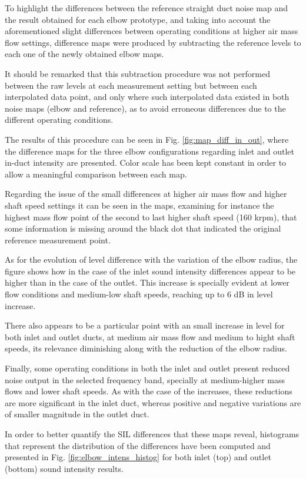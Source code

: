 To highlight the differences between the reference straight duct noise map and the result obtained for each elbow prototype, and taking into account the aforementioned slight differences between operating conditions at higher air mass flow settings, difference maps were produced by subtracting the reference levels to each one of the newly obtained elbow maps.

It should be remarked that this subtraction procedure was not performed between the raw levels at each measurement setting but between each interpolated data point, and only where such interpolated data existed in both noise maps (elbow and reference), as to avoid erroneous differences due to the different operating conditions. 

The results of this procedure can be seen in Fig. \ref{fig:map_diff_in_out}, where the difference maps for the three elbow configurations regarding inlet and outlet in-duct intensity are presented. Color scale has been kept constant in order to allow a meaningful comparison between each map.

Regarding the issue of the small differences at higher air mass flow and higher shaft speed settings it can be seen in the maps, examining for instance the highest mass flow point of the second to last higher shaft speed (160 krpm), that some information is missing around the black dot that indicated the original reference measurement point. 

As for the evolution of level difference with the variation of the elbow radius, the figure shows how in the case of the inlet sound intensity differences appear to be higher than in the case of the outlet. This increase is specially evident at lower flow conditions and medium-low shaft speeds, reaching up to 6 dB in level increase. 

There also appears to be a particular point with an small increase in level for both inlet and outlet ducts, at medium air mass flow and medium to hight shaft speeds, its relevance diminishing along with the reduction of the elbow radius.

Finally, some operating conditions in both the inlet and outlet present reduced noise output in the selected frequency band, specially at medium-higher mass flows and lower shaft speeds. As with the case of the increases, these reductions are more significant in the inlet duct, whereas positive and negative variations are of smaller magnitude in the outlet duct.

In order to better quantify the SIL differences that these maps reveal, histograms that represent the distribution of the differences have been computed and presented in Fig. \ref{fig:elbow_intens_histog} for both inlet (top) and outlet (bottom) sound intensity results.

